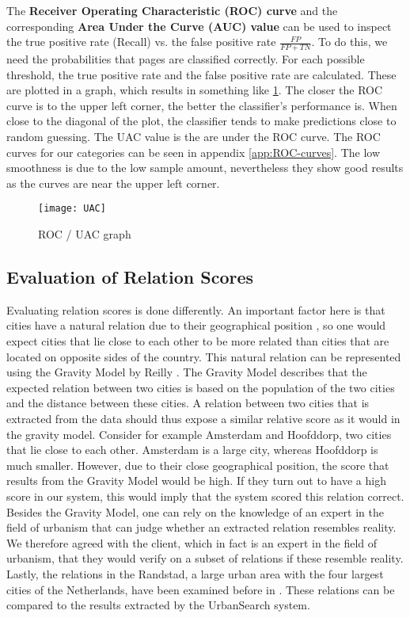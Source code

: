 The \textbf{Receiver Operating Characteristic (ROC) curve} and the corresponding \textbf{Area Under the Curve (AUC) value} can be used to inspect the true positive rate (Recall) vs. the false positive rate $\frac{FP}{FP + TN}$. To do this, we need the probabilities that pages are classified correctly. For each possible threshold, the true positive rate and the false positive rate are calculated. These are plotted in a graph, which results in something like \ref{fig:UAC}. The closer the ROC curve is to the upper left corner, the better the classifier's performance is. When close to the diagonal of the plot, the classifier tends to make predictions close to random guessing. The UAC value is the are under the ROC curve. The ROC curves for our categories can be seen in appendix \ref{app:ROC-curves}. The low smoothness is due to the low sample amount, nevertheless they show good results as the curves are near the upper left corner.


\begin{figure}[ht]
\centering
\texttt{[image: UAC]}
\caption{ROC / UAC graph \protect\footnotemark{}}
\label{fig:UAC}
\end{figure}

\subsection{Evaluation of Relation Scores} \label{sec:validation_protocol}
Evaluating relation scores is done differently. An important factor here is that cities have a natural relation due to their geographical position \cite{tobler1970computer}, so one would expect cities that lie close to each other to be more related than cities that are located on opposite sides of the country. This natural relation can be represented using the Gravity Model by Reilly \cite{reilly1931law}. The Gravity Model describes that the expected relation between two cities is based on the population of the two cities and the distance between these cities. A relation between two cities that is extracted from the data should thus expose a similar relative score as it would in the gravity model. Consider for example Amsterdam and Hoofddorp, two cities that lie close to each other. Amsterdam is a large city, whereas Hoofddorp is much smaller. However, due to their close geographical position, the score that results from the Gravity Model would be high. If they turn out to have a high score in our system, this would imply that the system scored this relation correct. Besides the Gravity Model, one can rely on the knowledge of an expert in the field of urbanism that can judge whether an extracted relation resembles reality. We therefore agreed with the client, which in fact is an expert in the field of urbanism, that they would verify on a subset of relations if these resemble reality. Lastly, the relations in the Randstad, a large urban area with the four largest cities of the Netherlands, have been examined before in \cite{van2010economic}. These relations can be compared to the results extracted by the  UrbanSearch system.

